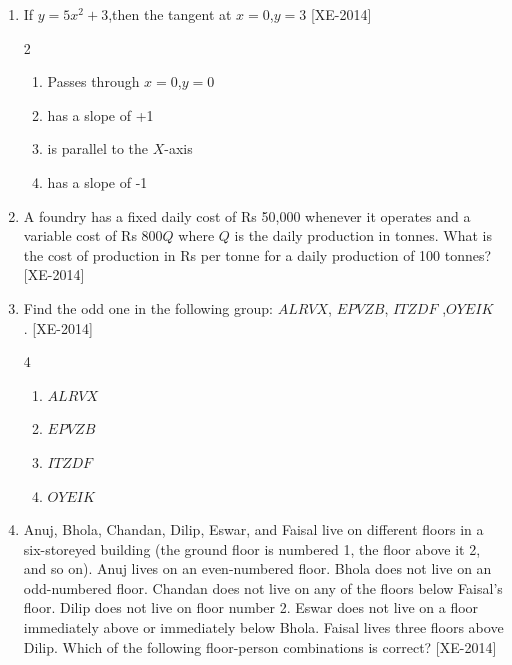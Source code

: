 \documentclass[journal]{IEEEtran}
\begin{document}
\begin{enumerate}
    \item If $y = 5x^2 + 3$,then the tangent at $x =0$,$y =3$ \hfill{[XE-2014]}
    \begin{multicols}{2}
        \begin{enumerate}
            \item Passes through $x = 0$,$y = 0$
            \item has a slope of +1
            \item is parallel to the $X$-axis
            \item has a slope of -1
        \end{enumerate}
    \end{multicols}
    
    \item A foundry has a fixed daily cost of Rs 50,000 whenever it operates and a variable cost of Rs 800$Q$ where $Q$ is the daily production in tonnes. What is the cost of production in Rs per tonne for a daily production of 100 tonnes? \hfill{[XE-2014]} \\ 

    \item Find the odd one in the following group: $ALRVX$, $EPVZB$, $ITZDF$ ,$OYEIK$ \\. \hfill{[XE-2014]}
\begin{multicols}{4}
    \begin{enumerate}
        \item $ALRVX$
        \item $EPVZB$
        \item $ITZDF$
        \item $OYEIK$
    \end{enumerate}
    \end{multicols}
    

    \item Anuj, Bhola, Chandan, Dilip, Eswar, and Faisal live on different floors in a six-storeyed building (the ground floor is numbered 1, the floor above it 2, and so on). Anuj lives on an even-numbered floor. Bhola does not live on an odd-numbered floor. Chandan does not live on any of the floors below Faisal’s floor. Dilip does not live on floor number 2. Eswar does not live on a floor immediately above or immediately below Bhola. Faisal lives three floors above Dilip. Which of the following floor-person combinations is correct? \hfill{[XE-2014]}
    
    \begin{table}[H]
        \centering
        
        \end{table}


\end{enumerate}
\end{document}
